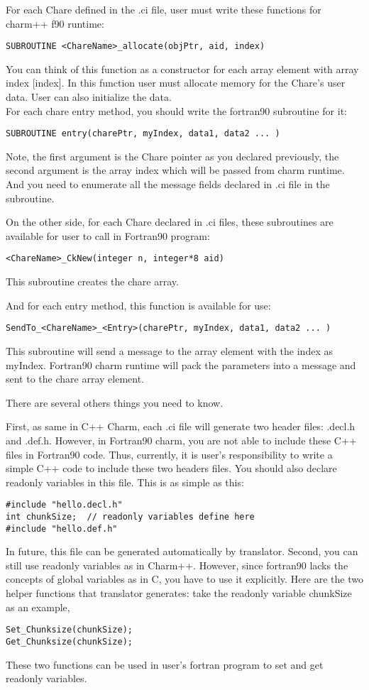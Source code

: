 \documentclass[11pt]{article}
\begin{document}
For each Chare defined in the .ci file, user must write these functions
for charm++ f90 runtime:

  \verb+SUBROUTINE <ChareName>_allocate(objPtr, aid, index)+

  You can think of this function as a constructor for each array element 
with array index [index]. In this function user must allocate memory for 
the Chare's user data. User can also initialize the data.	\\
  For each chare entry method, you should write the fortran90 subroutine
for it:

  \verb+SUBROUTINE entry(charePtr, myIndex, data1, data2 ... )+

  Note, the first argument is the Chare pointer as you declared previously, the second argument is the array index which will be passed from charm runtime. And you need to enumerate all the message fields declared in .ci file in the 
subroutine.

On the other side, for each Chare declared in .ci files, these subroutines are 
available for user to call in Fortran90 program:

  \verb+<ChareName>_CkNew(integer n, integer*8 aid)+

  This subroutine creates the chare array.

And for each entry method, this function is available for use:

  \verb+SendTo_<ChareName>_<Entry>(charePtr, myIndex, data1, data2 ... )+

  This subroutine will send a message to the array element with the index
as myIndex. Fortran90 charm runtime will pack the parameters into a message
and sent to the chare array element.

There are several others things you need to know.

First, as same in C++ Charm, each .ci file will generate two header files:
.decl.h and .def.h. However, in Fortran90 charm, you are not able to include 
these C++ files in Fortran90 code. Thus, currently, it is user's 
responsibility to write a simple C++ code to include these two headers files. 
You should also declare readonly variables in this file. This is as simple as 
this:

\begin{verbatim}
#include "hello.decl.h"
int chunkSize; 	// readonly variables define here
#include "hello.def.h"
\end{verbatim}

In future, this file can be generated automatically by translator.
Second, you can still use readonly variables as in Charm++. However, since
fortran90 lacks the concepts of global variables as in C, you have to use it
explicitly. Here are the two helper functions that translator generates:
take the readonly variable chunkSize as an example,
\begin{verbatim}
Set_Chunksize(chunkSize);
Get_Chunksize(chunkSize);
\end{verbatim}
These two functions can be used in user's fortran program to set and get 
readonly variables.
\end{document}
